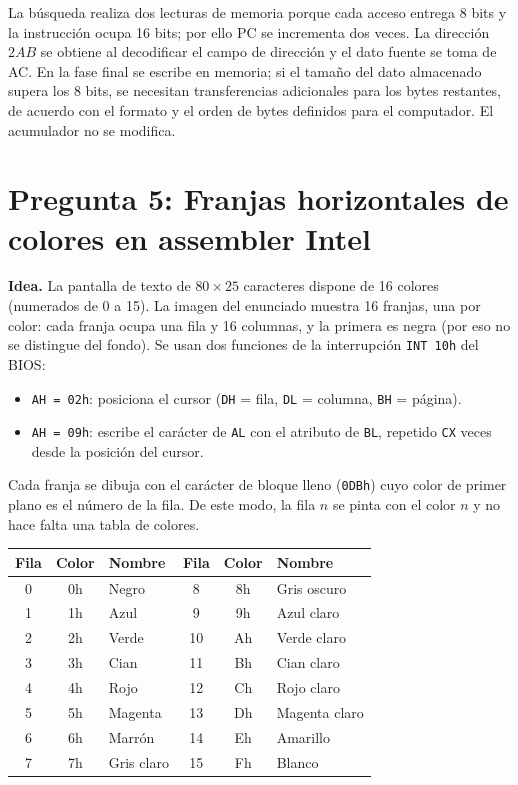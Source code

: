 \documentclass[10pt]{article}
\begin{document}
La búsqueda realiza dos lecturas de memoria porque cada acceso entrega 8 bits y la instrucción ocupa 16 bits; por ello PC se incrementa dos veces. La dirección $2AB$ se obtiene al decodificar el campo de dirección y el dato fuente se toma de AC. En la fase final se escribe en memoria; si el tamaño del dato almacenado supera los 8 bits, se necesitan transferencias adicionales para los bytes restantes, de acuerdo con el formato y el orden de bytes definidos para el computador. El acumulador no se modifica.
 
\section{Pregunta 5: Franjas horizontales de colores en assembler Intel}
 
\textbf{Idea.} La pantalla de texto de $80 \times 25$ caracteres dispone de 16 colores (numerados de 0 a 15). La imagen del enunciado muestra 16 franjas, una por color: cada franja ocupa una fila y 16 columnas, y la primera es negra (por eso no se distingue del fondo). Se usan dos funciones de la interrupción \texttt{INT 10h} del BIOS:
 
\begin{itemize}
  \item \texttt{AH = 02h}: posiciona el cursor (\texttt{DH} = fila, \texttt{DL} = columna, \texttt{BH} = página).
  \item \texttt{AH = 09h}: escribe el carácter de \texttt{AL} con el atributo de \texttt{BL}, repetido \texttt{CX} veces desde la posición del cursor.
\end{itemize}
 
Cada franja se dibuja con el carácter de bloque lleno (\texttt{0DBh}) cuyo color de primer plano es el número de la fila. De este modo, la fila $n$ se pinta con el color $n$ y no hace falta una tabla de colores.
 
\begingroup
\footnotesize
\setlength{\tabcolsep}{5pt}
\begin{center}
\begin{tabular}{c c l | c c l}
  \hline
  \textbf{Fila} & \textbf{Color} & \textbf{Nombre} & \textbf{Fila} & \textbf{Color} & \textbf{Nombre} \\
  \hline
  0 & 0h & Negro        &  8 & 8h & Gris oscuro \\
  1 & 1h & Azul         &  9 & 9h & Azul claro \\
  2 & 2h & Verde        & 10 & Ah & Verde claro \\
  3 & 3h & Cian         & 11 & Bh & Cian claro \\
  4 & 4h & Rojo         & 12 & Ch & Rojo claro \\
  5 & 5h & Magenta      & 13 & Dh & Magenta claro \\
  6 & 6h & Marrón       & 14 & Eh & Amarillo \\
  7 & 7h & Gris claro   & 15 & Fh & Blanco \\
  \hline
\end{tabular}
\end{center}
\endgroup
 
\end{document}
